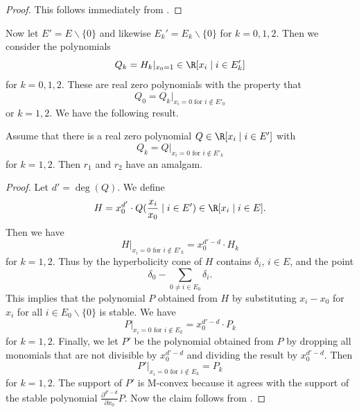 \begin{proof}
    This follows immediately from .
\end{proof}

Now let $E'=E\smallsetminus\{0\}$ and likewise $E_k'=E_k\smallsetminus\{0\}$ for $k=0,1,2$. Then we consider the polynomials
\begin{equation*}
    Q_k=H_k|_{x_0=1}\in\R[x_i\mid i\in E_k']
\end{equation*}
for $k=0,1,2$. These are real zero polynomials with the property that
\begin{equation*}
    Q_0=Q_k|_{x_i=0\textrm{ for }i\not\in E'_0}
\end{equation*}
or $k=1,2$. We have the following result.

\begin{thm}\label{thm:amalmain}
    Assume that there is a real zero polynomial $Q\in\R[x_i\mid i\in E']$ with 
    \begin{equation*}
        Q_k=Q|_{x_i=0\textrm{ for }i\not\in E'_k}
    \end{equation*}
    for $k=1,2$. Then $r_1$ and $r_2$ have an amalgam.
\end{thm}

\begin{proof}
    Let $d'=\deg(Q)$. We define
    \begin{equation*}
        H=x_0^{d'}\cdot Q(\frac{x_i}{x_0}\mid i\in E')\in\R[x_i\mid i\in E].
    \end{equation*}
    Then we have
    \begin{equation*}
        H|_{x_i=0\textrm{ for }i\not\in E'_k}=x_0^{d'-d}\cdot H_k
    \end{equation*}
    for $k=1,2$. Thus by  the hyperbolicity cone of $H$ contains $\delta_i$, $i\in E$, and the point
    \begin{equation*}
        \delta_0-\sum_{0\neq i\in E_0}\delta_i.
    \end{equation*}
    This implies that the polynomial $P$ obtained from $H$ by substituting $x_i-x_0$ for $x_i$ for all $i\in E_0\smallsetminus\{0\}$ is stable. We have
    \begin{equation*}
        P|_{x_i=0\textrm{ for }i\not\in E_k}=x_0^{d'-d}\cdot P_k
    \end{equation*}
    for $k=1,2$. Finally, we let $P'$ be the polynomial obtained from $P$ by dropping all monomials that are not divisible by $x_0^{d'-d}$ and dividing the result by $x_0^{d'-d}$. Then
    \begin{equation*}
        P'|_{x_i=0\textrm{ for }i\not\in E_k}=P_k
    \end{equation*}
    for $k=1,2$. The support of $P'$ is M-convex because it agrees with the support of the stable polynomial $\frac{\partial^{d'-d}}{\partial x_0}P$. Now the claim follows from .
\end{proof}

